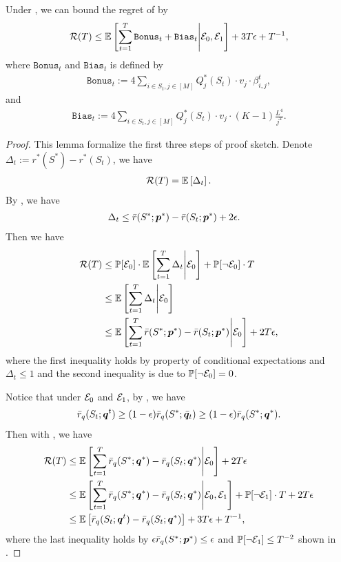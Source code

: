\begin{lemma}\label{lemma:regret-decomp}
Under , we can bound the regret of  by
\begin{align*}
    {\mathcal{R}}(T) \le \mathbb{E}\left[\sum_{t=1}^T \texttt{Bonus}_t + \texttt{Bias}_t\middle| {\mathcal{E}}_0, {\mathcal{E}}_1\right] + 3T\epsilon + T^{-1},
\end{align*}
where $\texttt{Bonus}_t$ and $\texttt{Bias}_t$ is defined by
\begin{align}\label{eq:def-bonus-t}
    \texttt{Bonus}_t := 4 \sum_{i \in S_t, j \in [M]} Q_{j}^{*}(S_t) \cdot v_j \cdot \beta_{i,j}^t,
\end{align}
and
\begin{align}\label{eq:def-bias-t}
    \texttt{Bias}_t := 4 \sum_{i \in S_t, j \in [M]} Q_{j}^{*}(S_t) \cdot v_j \cdot (K-1)\frac{L^4}{j^2}.
\end{align}
\begin{proof}
This lemma formalize the first three steps of proof sketch. Denote $\Delta_t := r^*(S^*) - r^*(S_t)$, we have 
\begin{align*}
    {\mathcal{R}}(T) = \mathbb{E}\left[\Delta_t\right].
\end{align*}
By , we have
\begin{align*}
    \Delta_t &\le  \bar r(S^*; {\bm{p}}^*) - \bar r(S_t; {\bm{p}}^*) + 2\epsilon.
\end{align*}
Then we have
\begin{align*}
    {\mathcal{R}}(T) &\le {\mathbb{P}}[{\mathcal{E}}_0] \cdot \mathbb{E}\left[\sum_{t=1}^T\Delta_t \middle| {\mathcal{E}}_0\right] + {\mathbb{P}}[\neg{\mathcal{E}}_0] \cdot T \\
    &\le \mathbb{E}\left[\sum_{t=1}^T\Delta_t \middle| {\mathcal{E}}_0\right] \\
    &\le \mathbb{E}\left[\sum_{t=1}^T\bar r(S^*; {\bm{p}}^*) - \bar r(S_t; {\bm{p}}^*) \middle| {\mathcal{E}}_0\right] + 2T\epsilon,
\end{align*}
where the first inequality holds by property of conditional expectations and $\Delta_t \le 1$ and the second inequality is due to ${\mathbb{P}}[\neg{\mathcal{E}}_0] = 0$.

Notice that under ${\mathcal{E}}_0$ and ${\mathcal{E}}_1$, by , we have
\begin{align*}
    \bar r_q(S_t; {\bm{q}}^t) \ge (1-\epsilon)\bar r_q(S^*; \bar {{\bm{q}}}_t) \ge (1-\epsilon)\bar r_q(S^*; {\bm{q}}^*).
\end{align*}
Then with , we have
\begin{align*}
    {\mathcal{R}}(T) &\le \mathbb{E}\left[\sum_{t=1}^T\bar r_q(S^*; {\bm{q}}^*) - \bar r_q(S_t; {\bm{q}}^*) \middle| {\mathcal{E}}_0\right] + 2T\epsilon \\
    &\le \mathbb{E}\left[\sum_{t=1}^T\bar r_q(S^*; {\bm{q}}^*) - \bar r_q(S_t; {\bm{q}}^*) \middle| {\mathcal{E}}_0,{\mathcal{E}}_1\right] + {\mathbb{P}}[\neg{\mathcal{E}}_1]\cdot T +  2T\epsilon \\
    &\le \mathbb{E}\left[\bar r_q(S_t; {\bm{q}}^t) - \bar r_q(S_t; {\bm{q}}^*)\right] + 3T\epsilon + T^{-1},
\end{align*}
where the last inequality holds by $\epsilon\bar r_q(S^*;{\bm{p}}^*) \le \epsilon$ and ${\mathbb{P}}[\neg{\mathcal{E}}_1] \le T^{-2}$ shown in .  


\end{proof}
\end{lemma}
